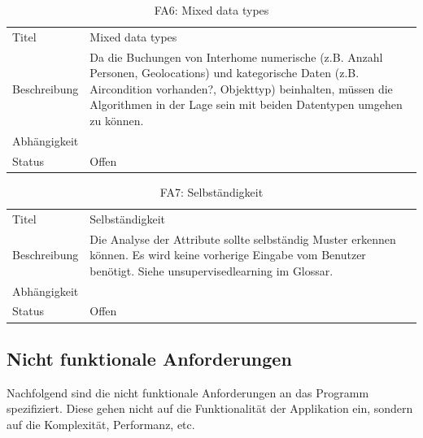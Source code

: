 \begin{table}[H] 
	\caption{FA6: Mixed data types}
	\centering
	\label{fig:anforderungsanalyse:nichtfunktionaleanforderung:fa6}
	\begin{tabular}{ | l | L{10cm} | } 
		\hline 
		 \\ \hline 
		Titel & Mixed data types \\ \hline 
		Beschreibung & Da die Buchungen von Interhome numerische (z.B. Anzahl Personen, Geolocations) und kategorische Daten (z.B. Aircondition vorhanden?, Objekttyp) beinhalten, müssen die Algorithmen in der Lage sein mit beiden Datentypen umgehen zu können. \\ \hline 
		Abhängigkeit & \\ \hline 
		Status & Offen \\ \hline 
	\end{tabular}
\end{table}

\begin{table}[H] 
	\caption{FA7: Selbständigkeit}
	\centering
	\label{fig:anforderungsanalyse:nichtfunktionaleanforderung:fa7}
	\begin{tabular}{ | l | L{10cm} | } 
		\hline 
		 \\ \hline 
		Titel & Selbständigkeit \\ \hline 
		Beschreibung & Die Analyse der Attribute sollte selbständig Muster erkennen können. Es wird keine vorherige Eingabe vom Benutzer benötigt. Siehe \gls{unsupervisedlearning} im Glossar. \\ \hline 
		Abhängigkeit & \\ \hline 
		Status & Offen \\ \hline 
	\end{tabular}
\end{table}


\subsection{Nicht funktionale Anforderungen}
\label{sec:anforderungsanalyse:nichtfunktionaleanforderung}
Nachfolgend sind die nicht funktionale Anforderungen an das Programm spezifiziert. Diese gehen nicht auf die Funktionalität der Applikation ein, sondern auf die Komplexität, Performanz, etc.

